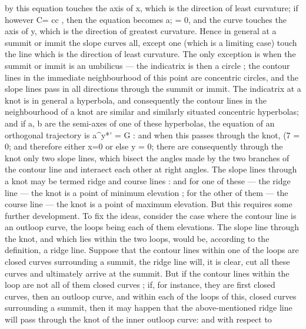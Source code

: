 \documentclass[11pt,a4paper]{book}
\begin{document}
by  this  equation  touches  the  axis  of  x,  which  is  the  direction  of  least  curvature;  if
however  C=  cc ,  then  the  equation  becomes  a;  =  0,  and  the  curve  touches  the  axis  of  y,
which  is  the  direction  of  greatest  curvature.  Hence  in  general  at  a  summit  or  immit
the  slope  curves  all,  except  one  (which  is  a  limiting  case)  touch  the  line  which  is
the  direction  of  least  curvature.  The  only  exception  is  when  the  summit  or  immit  is
an  umbilicus — the  indicatrix  is  then  a  circle ;  the  contour  lines  in  the  immediate
neighbourhood  of  this  point  are  concentric  circles,  and  the  slope  lines  pass  in  all
directions  through  the  summit  or  immit.
The  indicatrix  at  a  knot  is  in  general  a  hyperbola,  and  consequently  the  contour
lines  in  the  neighbourhood  of  a  knot  are  similar  and  similarly  situated  concentric
hyperbolas;  and  if  a,  b  are  the  semi-axes  of  one  of  these  hyperbolas,  the  equation  of
an  orthogonal  trajectory  is  a^y*'  =  G :  and  when  this  passes  through  the  knot,  (7  =  0;
and  therefore  either  x=0  or  else  y  =  0;  there  are  consequently  through  the  knot  only
two  slope  lines,  which  bisect  the  angles  made  by  the  two  branches  of  the  contour
line  and  interaect  each  other  at  right  angles.  The  slope  lines  through  a  knot  may  be
termed  ridge  and  course  lines :  and  for  one  of  these — the  ridge  line — the  knot  is  a
point  of  minimum  elevation ;  for  the  other  of  them — the  course  line — the  knot  is  a
point  of  maximum  elevation.  But  this  requires  some  further  development.  To  fix  the
ideas,  consider  the  case  where  the  contour  line  is  an  outloop  curve,  the  loops  being
each  of  them  elevations.  The  slope  line  through  the  knot,  and  which  lies  within  the
two  loops,  would  be,  according  to  the  definition,  a  ridge  line.  Suppose  that  the
contour  lines  within  one  of  the  loops  are  closed  curves  surrounding  a  summit,  the  ridge
line  will,  it  is  clear,  cut  all  these  curves  and  ultimately  arrive  at  the  summit.  But
if  the  contour  lines  within  the  loop  are  not  all  of  them  closed  curves ;  if,  for  instance,
they  are  first  closed  curves,  then  an  outloop  curve,  and  within  each  of  the  loops  of
this,  closed  curves  surrounding  a  summit,  then  it  may  happen  that  the  above-mentioned
ridge  line  will  pass  through  the  knot  of  the  inner  outloop  curve:  and  with  respect  to
\end{document}
